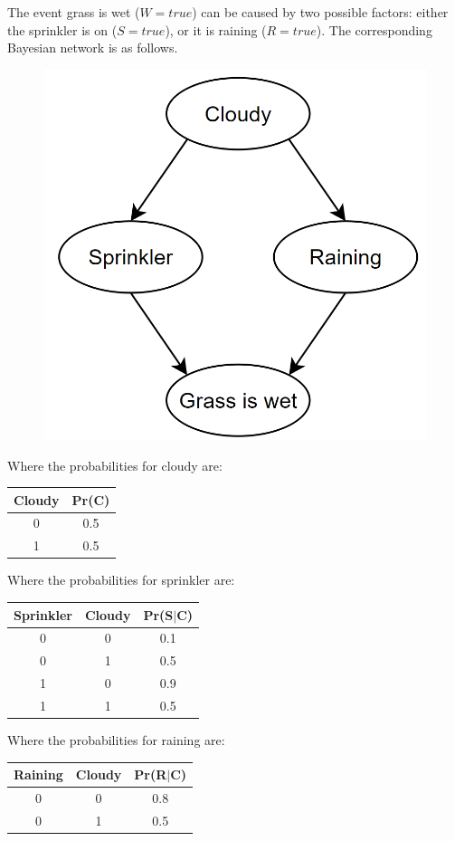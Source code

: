 \begin{example}
    The event grass is wet ($W=true$) can be caused by two possible factors: either the sprinkler is on ($S=true$), or it is raining ($R=true$). 
    The corresponding Bayesian network is as follows.
    \begin{figure}[H]
        \centering
        \includegraphics[width=0.25\linewidth]{images/sprinkler.png}
    \end{figure}
    Where the probabilities for cloudy are: 
    \begin{table}[H]
        \centering
        \begin{tabular}{cc}
        \hline
        \textbf{Cloudy} & \textbf{Pr(C)} \\ \hline
        0      & 0.5  \\
        1      & 0.5  \\ \hline
        \end{tabular}
    \end{table}
    Where the probabilities for sprinkler are: 
    \begin{table}[H]
        \centering
        \begin{tabular}{ccc}
        \hline
        \textbf{Sprinkler} & \textbf{Cloudy} & \textbf{Pr(S$\mid $C)} \\ \hline
        0         & 0      & 0.1  \\
        0         & 1      & 0.5  \\
        1         & 0      & 0.9  \\
        1         & 1      & 0.5  \\ \hline
        \end{tabular}
    \end{table}
    Where the probabilities for raining are: 
    \begin{table}[H]
        \centering
        \begin{tabular}{ccc}
        \hline
        \textbf{Raining} & \textbf{Cloudy} & \textbf{Pr(R$\mid $C)} \\ \hline
        0       & 0      & 0.8    \\
        0       & 1      & 0.5    \\

\end{tabular}
\end{table}
\end{example}
